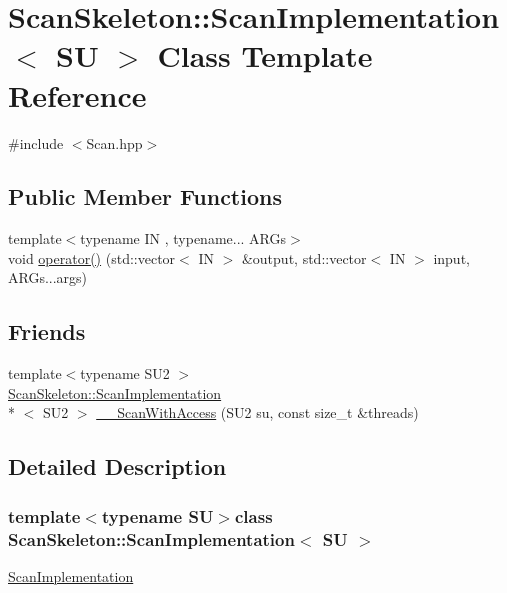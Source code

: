 \hypertarget{classScanSkeleton_1_1ScanImplementation}{\section{Scan\-Skeleton\-:\-:Scan\-Implementation$<$ S\-U $>$ Class Template Reference}
\label{classScanSkeleton_1_1ScanImplementation}
}


{\ttfamily \#include $<$Scan.\-hpp$>$}

\subsection*{Public Member Functions}
\begin{DoxyCompactItemize}
\item 
{\footnotesize template$<$typename I\-N , typename... A\-R\-Gs$>$ }\\void \hyperlink{classScanSkeleton_1_1ScanImplementation_a83b315d3ff4dcb1a82fcbce95194b0ba}{operator()} (std\-::vector$<$ I\-N $>$ \&output, std\-::vector$<$ I\-N $>$ input, A\-R\-Gs...\-args)
\end{DoxyCompactItemize}
\subsection*{Friends}
\begin{DoxyCompactItemize}
\item 
{\footnotesize template$<$typename S\-U2 $>$ }\\\hyperlink{classScanSkeleton_1_1ScanImplementation}{Scan\-Skeleton\-::\-Scan\-Implementation}\\*
$<$ S\-U2 $>$ \hyperlink{classScanSkeleton_1_1ScanImplementation_abe3a3f160ae7b38ff94db7eab167ecf1}{\-\_\-\-\_\-\-Scan\-With\-Access} (S\-U2 su, const size\-\_\-t \&threads)
\end{DoxyCompactItemize}


\subsection{Detailed Description}
\subsubsection*{template$<$typename S\-U$>$class Scan\-Skeleton\-::\-Scan\-Implementation$<$ S\-U $>$}

\hyperlink{classScanSkeleton_1_1ScanImplementation}{Scan\-Implementation} 

